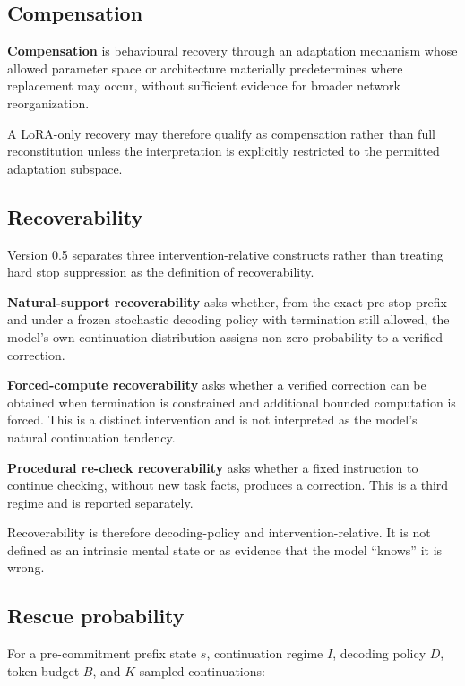 \subsection{Compensation}\label{compensation}

\textbf{Compensation} is behavioural recovery through an adaptation mechanism whose allowed parameter space or architecture materially predetermines where replacement may occur, without sufficient evidence for broader network reorganization.

A LoRA-only recovery may therefore qualify as compensation rather than full reconstitution unless the interpretation is explicitly restricted to the permitted adaptation subspace.

\subsection{Recoverability}\label{recoverability}

Version 0.5 separates three intervention-relative constructs rather than treating hard stop suppression as the definition of recoverability.

\textbf{Natural-support recoverability} asks whether, from the exact pre-stop prefix and under a frozen stochastic decoding policy with termination still allowed, the model's own continuation distribution assigns non-zero probability to a verified correction.

\textbf{Forced-compute recoverability} asks whether a verified correction can be obtained when termination is constrained and additional bounded computation is forced. This is a distinct intervention and is not interpreted as the model's natural continuation tendency.

\textbf{Procedural re-check recoverability} asks whether a fixed instruction to continue checking, without new task facts, produces a correction. This is a third regime and is reported separately.

Recoverability is therefore decoding-policy and intervention-relative. It is not defined as an intrinsic mental state or as evidence that the model ``knows'' it is wrong.

\subsection{Rescue probability}\label{rescue-probability}

For a pre-commitment prefix state \(s\), continuation regime \(I\), decoding policy \(D\), token budget \(B\), and \(K\) sampled continuations:

